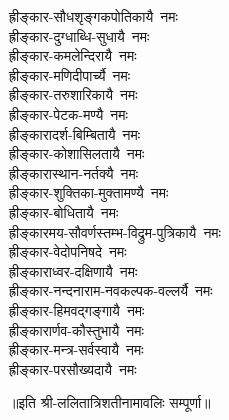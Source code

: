 \begin{multicols}{2}
\begin{flushleft}
ह्रीङ्कार-सौधशृङ्गकपोतिकायै~नमः\\
ह्रीङ्कार-दुग्धाब्धि-सुधायै~नमः\\
ह्रीङ्कार-कमलेन्दिरायै~नमः\\
ह्रीङ्कार-मणिदीपार्च्यै~नमः\\
ह्रीङ्कार-तरुशारिकायै~नमः\\
ह्रीङ्कार-पेटक-मण्यै~नमः\\
ह्रीङ्कारादर्श-बिम्बितायै~नमः\\
ह्रीङ्कार-कोशासिलतायै~नमः\\
ह्रीङ्कारास्थान-नर्तक्यै~नमः\hfill {}\\
ह्रीङ्कार-शुक्तिका-मुक्तामण्यै~नमः\\
ह्रीङ्कार-बोधितायै~नमः\\
ह्रीङ्कारमय-सौवर्णस्तम्भ-विद्रुम-पुत्रिकायै~नमः\\
ह्रीङ्कार-वेदोपनिषदे~नमः\\
ह्रीङ्काराध्वर-दक्षिणायै~नमः\\
ह्रीङ्कार-नन्दनाराम-नवकल्पक-वल्लर्यै~नमः\\
ह्रीङ्कार-हिमवद्गङ्गायै~नमः\\
ह्रीङ्कारार्णव-कौस्तुभायै~नमः\\
ह्रीङ्कार-मन्त्र-सर्वस्वायै~नमः\\
ह्रीङ्कार-परसौख्यदायै~नमः\hfill {}\\
\end{flushleft}
\end{multicols}
॥इति श्री-ललितात्रिशतीनामावलिः सम्पूर्णा॥
